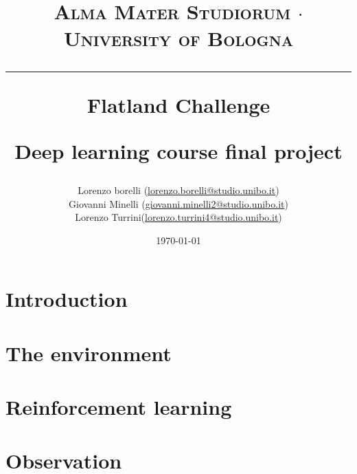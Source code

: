 \documentclass[a4paper,14pt]{extreport}
\begin{document}
\title{
	{{\large{\textsc{Alma Mater Studiorum $\cdot$ University of Bologna}}}}
	\rule{\textwidth}{0.4pt}\vspace{3mm}
	\textbf{Flatland Challenge}
	
	Deep learning course final project
}

\author{Lorenzo borelli (\href{mailto:lorenzo.borelli@studio.unibo.it}{lorenzo.borelli@studio.unibo.it}) 
\\ Giovanni Minelli (\href{mailto:giovanni.minelli2@studio.unibo.it}{giovanni.minelli2@studio.unibo.it}) 
\\ Lorenzo Turrini(\href{mailto:lorenzo.turrini4@studio.unibo.it}{lorenzo.turrini4@studio.unibo.it})}
\date{\today}
\maketitle
\newpage
\tableofcontents
\listoffigures
\listoftables
\newpage

\chapter{Introduction}


\chapter{The environment}


\chapter{Reinforcement learning}


\chapter{Observation}

\end{document}
